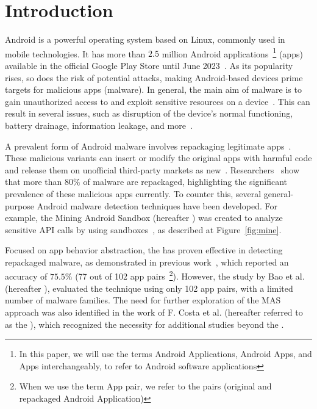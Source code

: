 \section{Introduction}\label{sec:introduction}

Android is a powerful operating system based on Linux, commonly used in mobile technologies. It has more than $2.5$ million Android applications~\footnote{In this paper, we will use the terms Android Applications, Android Apps, and Apps interchangeably, to refer to Android software applications} (apps) available in the official Google Play Store until June 2023~\cite{Statista}. As its popularity rises, so does the risk of potential attacks, making Android-based devices prime targets for malicious apps (malware). In general, the main aim of malware is to gain unauthorized access to and exploit sensitive resources on a device~\cite{DBLP:conf/ccs/FeltFCHW11,DBLP:journals/eswa/SurendranTE20}. This can result in several issues, such as disruption of the device's normal functioning, battery drainage, information leakage, and more~\cite{DBLP:conf/ccs/FeltFCHW11,DBLP:conf/sp/ZhouJ12}.

A prevalent form of Android malware involves repackaging legitimate apps~\cite{DBLP:conf/wcre/BaoLL18, le2018towards}. These malicious variants can insert or modify the original apps with harmful code and release them on unofficial third-party markets as new~\cite{DBLP:journals/tdsc/TianYRTP20}. Researchers~\cite{DBLP:journals/tdsc/TianYRTP20,DBLP:conf/sp/ZhouJ12} show that more than $80\%$ of malware are repackaged, highlighting the significant prevalence of these malicious apps currently. To counter this, several general-purpose Android malware detection techniques have been developed. For example, the Mining Android Sandbox (hereafter \mas) was created to analyze sensitive API calls by using sandboxes~\cite{DBLP:conf/icse/JamrozikSZ16}, as described at Figure~\ref{fig:mine}.

Focused on app behavior abstraction, the \mas has proven effective in detecting repackaged malware, as demonstrated in previous work~\cite{DBLP:conf/wcre/BaoLL18},  which reported an accuracy of $75.5\%$ (77 out of 102 app pairs~\footnote{When we use the term App pair, we refer to the pairs (original and repackaged Android Application)}). However, the study by Bao et al.~\cite{DBLP:conf/wcre/BaoLL18} (hereafter \blls), evaluated the technique using only 102 app pairs, with a limited number of malware families. The need for further exploration of the MAS approach was also identified in the work of F. Costa et al. (hereafter referred to as the \fhc), which recognized the necessity for additional studies beyond the \blls.


